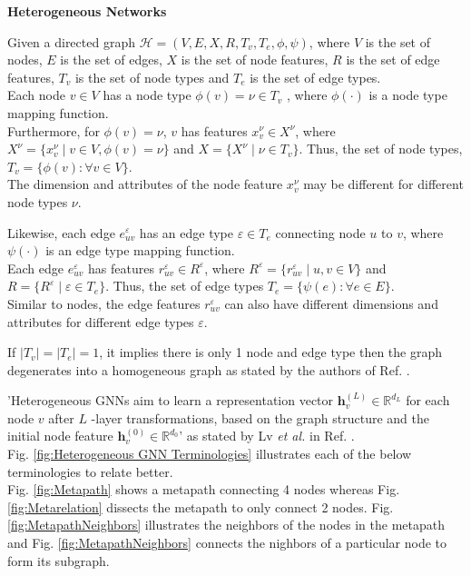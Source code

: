 \documentclass{report} %
\begin{document}
\textbf{Heterogeneous Networks}

Given a directed graph $\mathcal{H} = (V, E, X, R, T_v, T_e, \phi, \psi)$, 
where $V$ is the set of nodes, $E$  is the set of edges, $X$ is the set of node features, $R$ is the set of edge features, $T_v$ is the set of node types and 
$T_e$ is the set of edge types.\\

Each node $v \in V $ has a node type $\phi(v) = \nu \in T_v$ , where $\phi(\cdot)$ is a node type mapping function.\\
Furthermore, for $\phi(v) = \nu$, $v$ has features $x_v^{\nu} \in X^{\nu}$, 
where $X^{\nu} = \{ x_v^{\nu} \mid v \in V, \phi(v) = \nu \}$ and $X = \{ X^{\nu} \mid \nu \in T_v \}$. 
Thus, the set of node types, $T_v = \{ \phi(v) : \forall v \in V \}$.\\
The dimension and attributes of the node feature $x_v^{\nu}$ may be different for different node types $\nu$. 

Likewise, each edge $e_{uv}^{\varepsilon}$ has an edge type $\varepsilon \in T_e$ connecting node $u$ to $v$, where $\psi(\cdot)$ is an edge type mapping function. \\
Each edge $e_{uv}^{\varepsilon}$ has features $r_{uv}^{\varepsilon} \in R^{\varepsilon}$, 
where $R^{\varepsilon} = \{ r_{uv}^{\varepsilon} \mid u, v \in V \}$ and $R = \{ R^{\varepsilon} \mid \varepsilon \in T_e \}$. 
Thus, the set of edge types $T_e = \{ \psi(e) : \forall e \in E \}$. \\
Similar to nodes, the edge features $r_{uv}^{\varepsilon}$ can also have different dimensions and attributes for different edge types $\varepsilon$. 

If $|T_v| = |T_e| = 1$, it implies there is only 1 node and edge type then the graph degenerates into a homogeneous graph as stated by the authors of Ref. \cite{SE HGNN-2023}.

'Heterogeneous \ac{GNN}s aim to learn a representation vector $\mathbf{h}^{(L)}_v \in \mathbb{R}^{d_L}$ for each node $v$ after $L$ -layer transformations, 
based on the graph structure and the initial node feature $\mathbf{h}^{(0)}_v \in \mathbb{R}^{d_0}$'  as stated by  Lv \textit{et al.} in Ref. \cite{REF HGNN-2021}.\\

Fig. \ref{fig:Heterogeneous GNN Terminologies} illustrates each of the below terminologies to relate better.  \\
Fig. \ref{fig:Metapath} shows a metapath connecting 4 nodes whereas Fig. \ref{fig:Metarelation} dissects the metapath to only connect 2 nodes.
Fig. \ref{fig:MetapathNeighbors} illustrates the neighbors of the nodes in the metapath and Fig. \ref{fig:MetapathNeighbors} connects the nighbors of a particular node 
to form its subgraph. 
\end{document}
